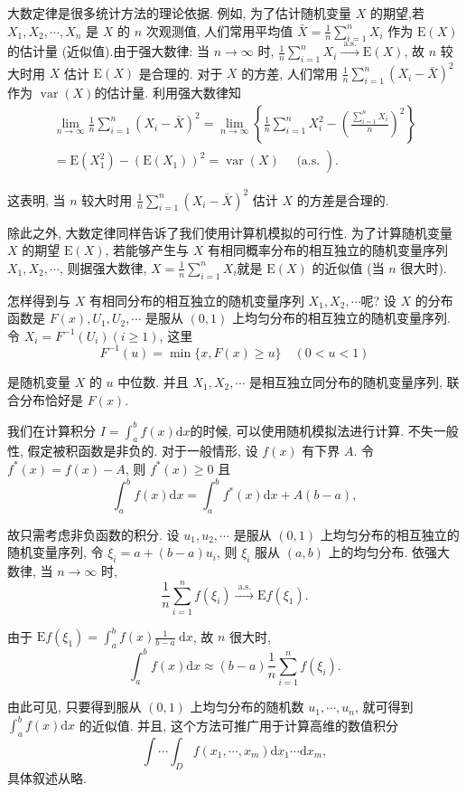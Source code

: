 大数定律是很多统计方法的理论依据. 例如, 为了估计随机变量 $X$ 的期望,若 $X_1, X_2, \cdots, X_n$ 是 $X$ 的 $n$ 次观测值, 人们常用平均值 $\bar{X}=\frac{1}{n} \sum_{i=1}^n X_i$ 作为 $\mathrm{E}(X)$ 的估计量 (近似值).由于强大数律: 当 $n \rightarrow \infty$ 时, $\frac{1}{n} \sum_{i=1}^n X_i \stackrel{\text { a.s. }}{\longrightarrow} \mathrm{E}(X)$, 故 $n$ 较大时用 $X$ 估计 $\mathrm{E}(X)$ 是合理的. 对于 $X$ 的方差, 人们常用 $\frac{1}{n} \sum_{i=1}^n\left(X_i-\bar{X}\right)^2$ 作为 $\operatorname{var}(X)$的估计量. 利用强大数律知
$$
\begin{gathered}
\lim _{n \rightarrow \infty} \frac{1}{n} \sum_{i=1}^n\left(X_i-\bar{X}\right)^2=\lim _{n \rightarrow \infty}\left\{\frac{1}{n} \sum_{i=1}^n X_i^2-\left(\frac{\sum_{i=1}^n X_i}{n}\right)^2\right\} \\
\left.=\mathrm{E}\left(X_1^2\right)-\left(\mathrm{E}\left(X_1\right)\right)^2=\operatorname{var}(X) \quad \text { (a.s. }\right) .
\end{gathered}
$$

这表明, 当 $n$ 较大时用 $\frac{1}{n} \sum_{i=1}^n\left(X_i-\bar{X}\right)^2$ 估计 $X$ 的方差是合理的.

除此之外, 大数定律同样告诉了我们使用计算机模拟的可行性. 为了计算随机变量 $X$ 的期望 $\mathrm{E}(X)$, 若能够产生与 $X$ 有相同概率分布的相互独立的随机变量序列 $X_1, X_2, \cdots$, 则据强大数律, $X=\frac{1}{n} \sum_{i=1}^n X_i$就是 $\mathrm{E}(X)$ 的近似值 (当 $n$ 很大时).

怎样得到与 $X$ 有相同分布的相互独立的随机变量序列 $X_1, X_2, \cdots$呢? 设 $X$ 的分布函数是 $F(x), U_1, U_2, \cdots$ 是服从 $(0,1)$ 上均匀分布的相互独立的随机变量序列. 令 $X_i=F^{-1}\left(U_i\right)(i \geqslant 1)$, 这里
$$
F^{-1}(u)=\min \{x, F(x) \geqslant u\} \quad(0<u<1)
$$

是随机变量 $X$ 的 $u$ 中位数. 并且 $X_1, X_2, \cdots$ 是相互独立同分布的随机变量序列, 联合分布恰好是 $F(x)$.

\begin{example}
    我们在计算积分 $I=\int_a^b f(x) \mathrm{d} x$的时候, 可以使用随机模拟法进行计算. 不失一般性, 假定被积函数是非负的. 对于一般情形, 设 $f(x)$ 有下界 $A$. 令 $f^*(x)=f(x)-A$, 则 $f^*(x) \geqslant 0$ 且
    $$
    \int_a^b f(x) \mathrm{d} x=\int_a^b f^*(x) \mathrm{d} x+A(b-a),
    $$
    
    故只需考虑非负函数的积分. 设 $u_1, u_2, \cdots$ 是服从 $(0,1)$ 上均匀分布的相互独立的随机变量序列, 令 $\xi_i=a+(b-a) u_i$, 则 $\xi_i$ 服从 $(a, b)$ 上的均匀分布. 依强大数律, 当 $n \rightarrow \infty$ 时,
    $$
    \frac{1}{n} \sum_{i=1}^n f\left(\xi_i\right) \stackrel{\text { a.s. }}{\longrightarrow} \mathrm{E} f\left(\xi_1\right) .
    $$
    
    由于 $\mathrm{E} f\left(\xi_1\right)=\int_a^b f(x) \frac{1}{b-a} \mathrm{~d} x$, 故 $n$ 很大时,
    $$
    \int_a^b f(x) \mathrm{d} x \approx(b-a) \frac{1}{n} \sum_{i=1}^n f\left(\xi_i\right) .
    $$
    
    由此可见, 只要得到服从 $(0,1)$ 上均匀分布的随机数 $u_1, \cdots, u_n$, 就可得到 $\int_a^b f(x) \mathrm{d} x$ 的近似值.
    并且, 这个方法可推广用于计算高维的数值积分
    $$
    \int \cdots \int_D f\left(x_1, \cdots, x_m\right) \mathrm{d} x_1 \cdots \mathrm{d} x_m,
    $$
    具体叙述从略.
\end{example}